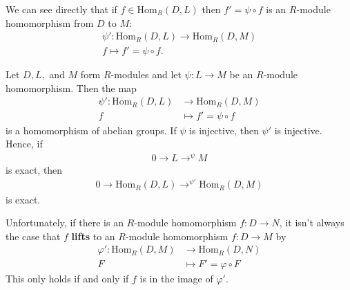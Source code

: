 \documentclass{memoir}
\begin{document}
We can see directly that if \(f \in \textrm{Hom}_R(D,L)\) then \(f' = \psi \circ f\) is an \(R\)-module homomorphism from \(D\) to \(M\):
\begin{align*}
	\psi': \textrm{Hom}_R(D,L) \to \textrm{Hom}_R(D,M)\\
	f \mapsto f' = \psi \circ f.
\end{align*}

\begin{prop}
	Let \(D,L,\) and \(M\) form \(R\)-modules and let \(\psi :L \to M\) be an \(R\)-module homomorphism. Then the map
	\begin{align*}
		\psi': \textrm{Hom}_R(D,L) &\to \textrm{Hom}_R(D,M)\\
		f &\mapsto f' = \psi \circ f
	\end{align*}
	is a homomorphism of abelian groups. If \(\psi \) is injective, then \(\psi '\) is injective. Hence, if
	\begin{align*}
		0 \to L \to^{\psi }M
	\end{align*} is exact, then
	\begin{align*}
		0 \to \textrm{Hom}_R(D,L) \to^{\psi '} \textrm{Hom}_R(D,M)
	\end{align*}
	is exact.
\end{prop}

Unfortunately, if there is an \(R\)-module homomorphism \(f:D \to N\), it isn't always the case that \(f\) \textbf{lifts} to an \(R\)-module homomorphism \(f:D\to M\) by
\begin{align*}
	\varphi ': \textrm{Hom}_R(D,M) &\to \textrm{Hom}_R(D,N)\\
	F &\mapsto F' = \varphi \circ F
\end{align*}
This only holds if and only if \(f\) is in the image of \(\varphi '\).

\begin{exmp}
	
\end{exmp}
\end{document}
